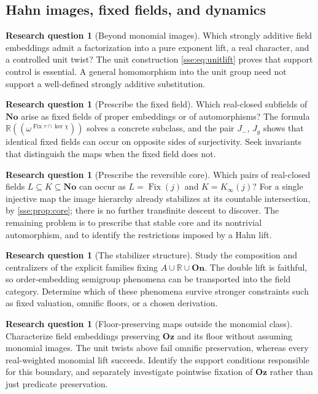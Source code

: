 \documentclass[11pt,a4paper]{article}
\numberwithin{equation}{section}
\theoremstyle{plain}
\theoremstyle{definition}
\newtheorem{question}[theorem]{Research question}
\theoremstyle{remark}
\newcommand{\No}{\mathbf{No}}
\newcommand{\Oz}{\mathbf{Oz}}
\newcommand{\On}{\mathbf{On}}
\newcommand{\R}{\mathbb{R}}
\newcommand{\Fix}{\operatorname{Fix}}
\newcommand{\NF}[1]{\R((\omega^{#1}))}
\begin{document}
\subsection{Hahn images, fixed fields, and dynamics}
\begin{question}[Beyond monomial images]
Which strongly additive field embeddings admit a factorization into a
pure exponent lift, a real character, and a controlled unit twist? The
unit construction \eqref{sse:eq:unitlift} proves that support control is
essential. A general homomorphism into the unit group need not support a
well-defined strongly additive substitution.
\end{question}

\begin{question}[Prescribe the fixed field]
Which real-closed subfields of $\No$ arise as fixed fields of proper
embeddings or of automorphisms? The formula
$\NF{\Fix\tau\cap\ker\chi}$ solves a concrete subclass, and the pair
$J_-$, $J_g$ shows that identical fixed fields can occur on opposite sides
of surjectivity. Seek invariants that distinguish the maps when the fixed
field does not.
\end{question}

\begin{question}[Prescribe the reversible core]
Which pairs of real-closed fields $L\subseteq K\subseteq\No$ can occur as
$L=\Fix(j)$ and $K=K_\infty(j)$? For a single injective map the image
hierarchy already stabilizes at its countable intersection, by
\cref{sse:prop:core}; there is no further transfinite descent to discover.
The remaining problem is to prescribe that stable core and its nontrivial
automorphism, and to identify the restrictions imposed by a Hahn lift.
\end{question}

\begin{question}[The stabilizer structure]
Study the composition and centralizers of the explicit families fixing
$A\cup\R\cup\On$. The double lift is faithful, so order-embedding
semigroup phenomena can be transported into the field category. Determine
which of these phenomena survive stronger constraints such as fixed
valuation, omnific floors, or a chosen derivation.
\end{question}

\begin{question}[Floor-preserving maps outside the monomial class]
Characterize field embeddings preserving $\Oz$ and its floor without
assuming monomial images. The unit twists above fail omnific preservation,
whereas every real-weighted monomial lift succeeds. Identify the support
conditions responsible for this boundary, and separately investigate
pointwise fixation of $\Oz$ rather than just predicate preservation.
\end{question}
\end{document}
